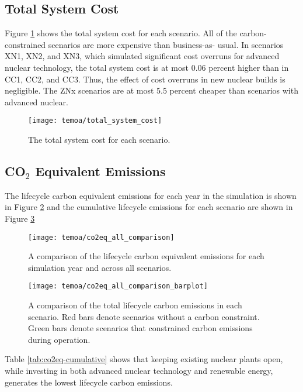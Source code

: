 \subsection{Total System Cost}
Figure \ref{fig:system-cost} shows the total system cost for each scenario.
All of the carbon-constrained scenarios are more expensive than business-as-
usual. In scenarios XN1, XN2, and XN3, which simulated significant cost overruns
for advanced nuclear technology, the total system cost is at most 0.06 percent
higher than in CC1, CC2, and CC3. Thus, the effect of cost overruns in new
nuclear builds is negligible. The ZNx scenarios are at most 5.5 percent cheaper
than scenarios with advanced nuclear. 

\begin{figure}[H]
  \centering
  \texttt{[image: temoa/total\_system\_cost]}
  \caption{The total system cost for each scenario.}
  \label{fig:system-cost}
\end{figure}

\subsection{CO$_2$ Equivalent Emissions}

The lifecycle carbon equivalent emissions for each year in the simulation is
shown in Figure \ref{fig:co2eq-all} and the cumulative lifecycle emissions
for each scenario are shown in Figure \ref{fig:co2eq-cumulative}

\begin{figure}[H]
  \texttt{[image: temoa/co2eq\_all\_comparison]}
  \caption{A comparison of the lifecycle carbon equivalent emissions for
  each simulation year and across all scenarios.}
  \label{fig:co2eq-all}
\end{figure}

\begin{figure}[H]
  \texttt{[image: temoa/co2eq\_all\_comparison\_barplot]}
  \caption{A comparison of the total lifecycle carbon emissions in each
  scenario. Red bars denote scenarios without a carbon constraint. Green bars
  denote scenarios that constrained carbon emissions during operation.}
  \label{fig:co2eq-cumulative}
\end{figure}

Table \ref{tab:co2eq-cumulative} shows that keeping existing nuclear
plants open, while investing in both advanced nuclear technology and renewable
energy, generates the lowest lifecycle carbon emissions.

